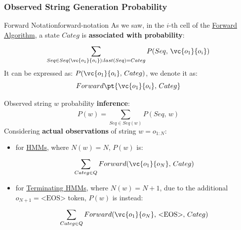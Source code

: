 \subsubsection{Observed String Generation Probability}\label{sub:in_observed_string_generation_probability} %
\begin{definition}{Forward Notation}{forward-notation}
    As we saw, in the $i$-th cell of the \hyperref[sub:in_forward_algorithm]{Forward Algorithm}, a state $Categ$ is \textbf{associated with probability}:
    \[
        \sum_{Seq\in Seq(\vc{o_1}{o_i}):last(Seq) = Categ}^{}{P(Seq,\,\vc{o_1}{o_i})}
    \]
    It can be expressed as: $P(\vc{o_1}{o_i},\,Categ)$, we denote it as:
    \[
        Forward \pt{\vc{o_1}{o_i},\,Categ}
    \]
\end{definition}
Observed string $w$ probability \textbf{inference}:
\[
    P(w) = \sum_{Seq\in Seq(w)}^{}{P(Seq,\,w)}
\]
Considering \textbf{actual observations} of string $w = o_{1:N}$:
\begin{itemize}
    \item for \hyperref[def:hmm]{HMMs}, where $N(w) = N$, $P(w)$ is:
        \[
            \sum_{Categ\in Q}^{}{Forward(\vc{o_1}{o_N},\,Categ)}
        \]
    \item for \hyperref[sub:lm_terminating_hidden_markov_models]{Terminating HMMs}, where $N(w) = N+1$, due to the additional $o_{N+1} = \text{<EOS>}$ token, $P(w)$ is instead:
        \[
            \sum_{Categ\in Q}^{}{Forward(\vc{o_1}{o_N},\,\text{<EOS>},\,Categ)}
        \]
\end{itemize}
%
